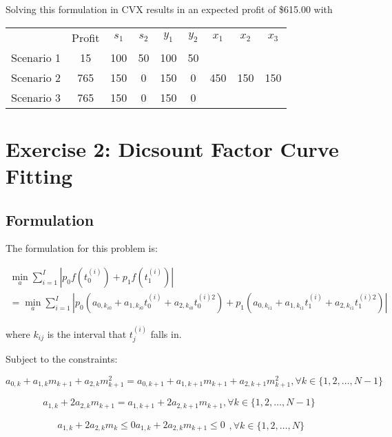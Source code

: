 \documentclass[a4paper]{article}
\begin{document}
Solving this formulation in CVX results in an expected profit of \$615.00 with

\begin{tabular}{c  c  c c  c c c c c}
           & Profit & $s_1$ & $s_2$ & $y_1$ & $y_2$ & $x_1$ & $x_2$ & $x_3$ \\
Scenario 1 &   15   & 100   & 50    & 100   & 50    &       &       &       \\
Scenario 2 &  765   & 150   & 0     & 150   & 0     & 450   & 150   & 150   \\
Scenario 3 &  765   & 150   & 0     & 150   & 0     &       &       &       \\
\end{tabular}

\section{Exercise 2: Dicsount Factor Curve Fitting }
\subsection{Formulation}
The formulation for this problem is:

\begin{equation}
  \begin{split}
\min_a \sum_{i=1}^I | p_0 f(t_0^{(i)}) +  p_1 f(t_1^{(i)}) |
\\ = \min_a \sum_{i=1}^I | p_0 (a_{0,k_{i0}} + a_{1,k_{i0}} t_0^{(i)} + a_{2,k_{i0}} t_0^{(i) 2} )
+  p_1 (a_{0,k_{i1}} + a_{1,k_{i1}} t_1^{(i)} + a_{2,k_{i1}} t_1^{(i) 2} ) |
  \end{split}
\end{equation}

where $k_{ij}$ is the interval that $t_j^{(i)}$ falls in.

Subject to the constraints:

\begin{equation}
a_{0,k} + a_{1,k} m_{k+1} + a_{2,k} m_{k+1}^2
=
a_{0,k+1} + a_{1,k+1} m_{k+1} + a_{2,k+1} m_{k+1}^2
, \forall k \in \{1,2,\dots,N-1\}
\end{equation}

\begin{equation}
a_{1,k} + 2 a_{2,k} m_{k+1}
=
a_{1,k+1} + 2 a_{2,k+1} m_{k+1}
, \forall k \in \{1,2,\dots,N-1\}
\end{equation}

\begin{equation}
\begin{matrix}
a_{1,k} + 2 a_{2,k} m_k \leq 0
a_{1,k} + 2 a_{2,k} m_{k+1} \leq 0
\end{matrix}
, \forall k \in \{1,2,\dots,N\}
\end{equation}
\end{document}
